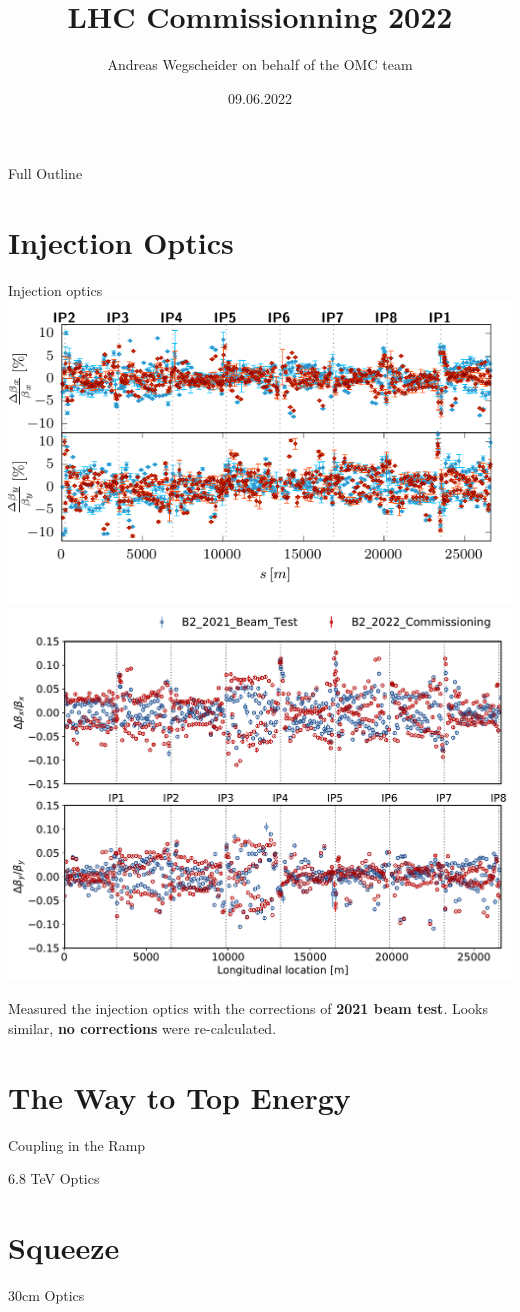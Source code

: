 \documentclass[11pt,usenames,dvipsnames]{beamer}
\author[OMC]{Andreas Wegscheider on behalf of the OMC team}
\title[LHC 2022]{LHC Commissionning 2022}
\institute{CERN}
\date[09.06.22]{09.06.2022}
\newcommand{\highl}[1]{\textbf{#1}}
\begin{document}


\begin{frame}
    \titlepage
\end{frame}


\begin{frame}{Full Outline}
\tableofcontents
\end{frame}
\small

\section{Injection Optics}
\begin{frame}{Injection optics}
    \includegraphics[width=0.49\linewidth]{images/beamtest/b1_bb.pdf}
    \hfill
    \includegraphics[width=0.49\linewidth]{images/beamtest/lhcb2_betabeat_vs_beamtest.pdf}
    
    Measured the injection optics with the corrections of \highl{2021 beam test}.
    Looks similar, \highl{no corrections} were re-calculated.
\end{frame}

\section{The Way to Top Energy}

\begin{frame}{Coupling in the Ramp}

\end{frame}

\begin{frame}{6.8 TeV Optics}

\end{frame}

\section{Squeeze}

\begin{frame}{30cm Optics}
    
\end{frame}

\end{document}
